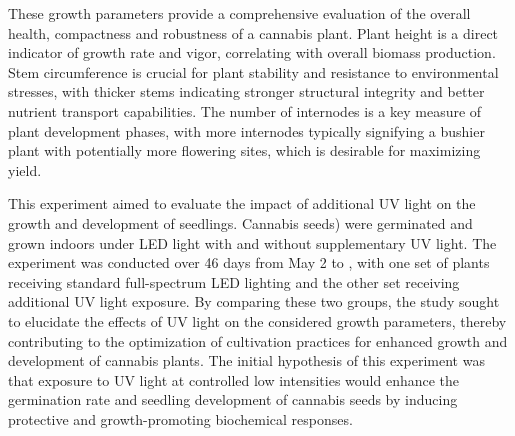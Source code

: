 These growth parameters provide a comprehensive evaluation of the overall health, compactness and robustness of a cannabis plant. Plant height is a direct indicator of growth rate and vigor, correlating with overall biomass production. Stem circumference is crucial for plant stability and resistance to environmental stresses, with thicker stems indicating stronger structural integrity and better nutrient transport capabilities. The number of internodes is a key measure of plant development phases, with more internodes typically signifying a bushier plant with potentially more flowering sites, which is desirable for maximizing yield.

This experiment aimed to evaluate the impact of additional UV light on the growth and development of  seedlings. Cannabis seeds) were germinated and grown indoors under LED light with and without supplementary UV light. The experiment was conducted over \num[mode=text]{46} days from May 2 to , with one set of plants receiving standard full-spectrum LED lighting and the other set receiving additional UV light exposure. By comparing these two groups, the study sought to elucidate the effects of UV light on the considered growth parameters, thereby contributing to the optimization of cultivation practices for enhanced growth and development of cannabis plants. The initial hypothesis of this experiment was that exposure to UV light at controlled low intensities would enhance the germination rate and seedling development of cannabis seeds by inducing protective and growth-promoting biochemical responses.